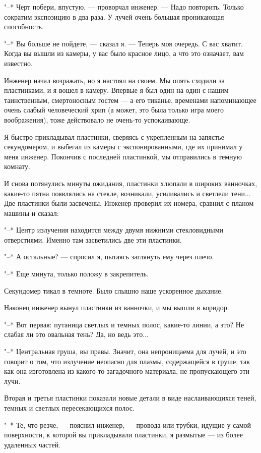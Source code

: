 "--* Черт побери, впустую, --- проворчал инженер. --- Надо  повторить.  Только
сократим  экспозицию  в  два  раза.  У  лучей  очень  большая  проникающая
способность.

"--* Вы больше не пойдете, --- сказал я. --- Теперь моя очередь. С вас хватит.
Когда вы вышли из камеры, у вас было красное лицо, а что это означает, вам
известно.

Инженер начал возражать, но я настоял на своем.  Мы  опять  сходили  за
пластинками, и я вошел в камеру. Впервые  я  был  один  на  один  с  нашим
таинственным, смертоносным гостем --- а его тиканье, временами  напоминающее
очень слабый человеческий хрип  (а  может,  это  была  только  игра  моего
воображения), тоже действовало не очень-то успокаивающе.

Я быстро прикладывал пластинки,  сверяясь  с  укрепленным  на  запястье
секундомером, и выбегал из камеры с экспонированными, где  их  принимал  у
меня инженер. Покончив с последней пластинкой,  мы  отправились  в  темную
комнату.

И  снова  потянулись  минуты  ожидания,  пластинки  хлюпали  в  широких
ванночках, какие-то пятна появлялись на стекле, возникали,  усиливались  и
светлели тени... Две пластинки были засвечены. Инженер проверил их номера,
сравнил с планом машины и сказал:

"--*  Центр  излучения  находится  между   двумя   нижними   стекловидными
отверстиями. Именно там засветились две эти пластинки.

"--* А остальные? --- спросил я, пытаясь заглянуть ему через плечо.

"--* Еще минута, только положу в закрепитель.

Секундомер тикал в темноте. Было слышно наше ускоренное дыхание.

Наконец инженер вынул пластинки из ванночки, и мы вышли в коридор.

"--* Вот первая: путаница светлых и темных полос, какие-то линии,  а  это?
Не слабая ли это овальная тень? Да, но ведь это...

"--* Центральная груша, вы правы. Значит, она непроницаема  для  лучей,  и
это говорит о том, что  излучение  неопасно  для  плазмы,  содержащейся  в
груше, так как она изготовлена  из  какого-то  загадочного  материала,  не
пропускающего эти лучи.

Вторая и третья пластинки показали новые детали в  виде  наслаивающихся
теней, темных и светлых пересекающихся полос.

"--* Те, что резче, --- пояснил инженер, ---  провода  или  трубки,  идущие  у
самой поверхности, к которой вы прикладывали пластинки, я  размытые  ---  из
более удаленных частей.

